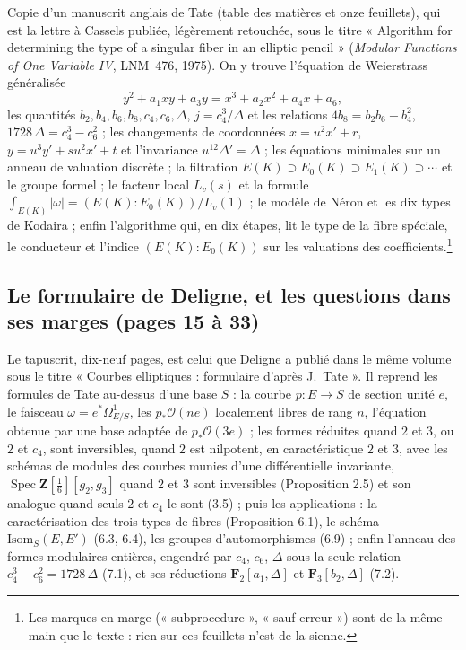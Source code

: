 \documentclass[11pt,a4paper]{article}
\begin{document}
Copie d'un manuscrit anglais de Tate (table des matières et onze feuillets),
qui est la lettre à Cassels publiée, légèrement retouchée, sous le titre
« Algorithm for determining the type of a singular fiber in an elliptic
pencil » (\emph{Modular Functions of One Variable IV}, LNM~476, 1975). On y
trouve l'équation de Weierstrass généralisée
\[
y^2 + a_1xy + a_3y = x^3 + a_2x^2 + a_4x + a_6,
\]
les quantités $b_2, b_4, b_6, b_8, c_4, c_6, \Delta$, $j = c_4^3/\Delta$ et les
relations $4b_8 = b_2b_6 - b_4^2$, $1728\,\Delta = c_4^3 - c_6^2$ ; les
changements de coordonnées $x = u^2x' + r$, $y = u^3y' + su^2x' + t$ et
l'invariance $u^{12}\Delta' = \Delta$ ; les équations minimales sur un anneau
de valuation discrète ; la filtration $E(K) \supset E_0(K) \supset E_1(K)
\supset \cdots$ et le groupe formel ; le facteur local $L_v(s)$ et la formule
$\int_{E(K)}|\omega| = (E(K):E_0(K))/L_v(1)$ ; le modèle de Néron et les dix
types de Kodaira ; enfin l'algorithme qui, en dix étapes, lit le type de la
fibre spéciale, le conducteur et l'indice $(E(K):E_0(K))$ sur les valuations des
coefficients.\footnote{Les marques en marge (« subprocedure », « sauf
erreur ») sont de la même main que le texte : rien sur ces feuillets n'est de
la sienne.}

\subsection*{Le formulaire de Deligne, et les questions dans ses marges (pages 15 à 33)}

Le tapuscrit, dix-neuf pages, est celui que Deligne a publié dans le même
volume sous le titre « Courbes elliptiques : formulaire d'après J.~Tate ». Il
reprend les formules de Tate au-dessus d'une base $S$ : la courbe $p\colon E
\to S$ de section unité $e$, le faisceau $\omega = e^*\Omega^1_{E/S}$, les
$p_*\mathcal{O}(ne)$ localement libres de rang $n$, l'équation obtenue par une
base adaptée de $p_*\mathcal{O}(3e)$ ; les formes réduites quand $2$ et $3$,
ou $2$ et $c_4$, sont inversibles, quand $2$ est nilpotent, en caractéristique
$2$ et $3$, avec les schémas de modules des courbes munies d'une
différentielle invariante, $\operatorname{Spec}\mathbf{Z}[\tfrac16][g_2,g_3]$
quand $2$ et $3$ sont inversibles (Proposition 2.5) et son analogue quand
seuls $2$ et $c_4$ le sont (3.5) ; puis les applications : la caractérisation des trois types de
fibres (Proposition 6.1), le schéma $\mathrm{Isom}_S(E,E')$ (6.3, 6.4), les
groupes d'automorphismes (6.9) ; enfin l'anneau des formes modulaires entières,
engendré par $c_4$, $c_6$, $\Delta$ sous la seule relation $c_4^3 - c_6^2 =
1728\,\Delta$ (7.1), et ses réductions $\mathbf{F}_2[a_1,\Delta]$ et
$\mathbf{F}_3[b_2,\Delta]$ (7.2).
\end{document}
